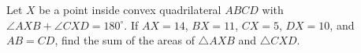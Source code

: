 Let $X$ be a point inside convex quadrilateral $ABCD$ with $\angle AXB+\angle CXD=180^{\circ}$. If $AX=14$, $BX=11$, $CX=5$, $DX=10$, and $AB=CD$, find the sum of the areas of $\triangle AXB$ and $\triangle CXD$.
